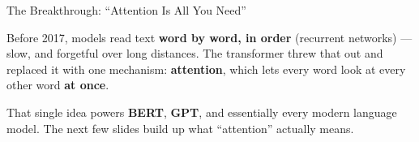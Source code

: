 \documentclass[aspectratio=169]{beamer}
\begin{document}
\begin{frame}{The Breakthrough: ``Attention Is All You Need''}
\vspace{0.2cm}
\begin{center}
\end{center}

\bigskip
{\small Before 2017, models read text \textbf{word by word, in order} (recurrent networks) ---
slow, and forgetful over long distances. The transformer threw that out and replaced it with
one mechanism: \textbf{attention}, which lets every word look at every other word \textbf{at
once}.}

\medskip
{\small That single idea powers \textbf{BERT}, \textbf{GPT}, and essentially every modern
language model. The next few slides build up what ``attention'' actually means.}
\end{frame}
\end{document}
